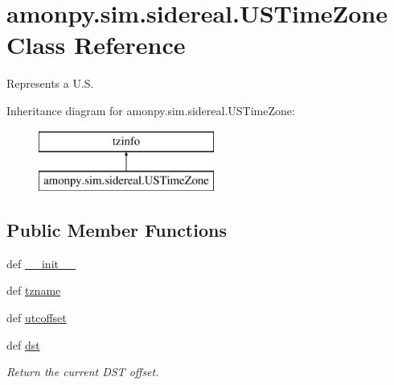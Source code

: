 \hypertarget{classamonpy_1_1sim_1_1sidereal_1_1_u_s_time_zone}{\section{amonpy.\-sim.\-sidereal.\-U\-S\-Time\-Zone Class Reference}
\label{classamonpy_1_1sim_1_1sidereal_1_1_u_s_time_zone}
}


Represents a U.\-S.  


Inheritance diagram for amonpy.\-sim.\-sidereal.\-U\-S\-Time\-Zone\-:\begin{figure}[H]
\begin{center}
\leavevmode
\includegraphics[height=2.000000cm]{db/d26/classamonpy_1_1sim_1_1sidereal_1_1_u_s_time_zone}
\end{center}
\end{figure}
\subsection*{Public Member Functions}
\begin{DoxyCompactItemize}
\item 
def \hyperlink{classamonpy_1_1sim_1_1sidereal_1_1_u_s_time_zone_ab601802cc6ed96e739dcadd996d9587a}{\-\_\-\-\_\-init\-\_\-\-\_\-}
\item 
def \hyperlink{classamonpy_1_1sim_1_1sidereal_1_1_u_s_time_zone_a0ec12f482689f531ca39f9af8af0182c}{tzname}
\item 
def \hyperlink{classamonpy_1_1sim_1_1sidereal_1_1_u_s_time_zone_ad34a3532bf51a65d154dd7e288059ebc}{utcoffset}
\item 
def \hyperlink{classamonpy_1_1sim_1_1sidereal_1_1_u_s_time_zone_a54135cabb3cc06777a94e5912b4ff29e}{dst}
\begin{DoxyCompactList}\small\item\em Return the current D\-S\-T offset. \end{DoxyCompactList}\end{DoxyCompactItemize}

